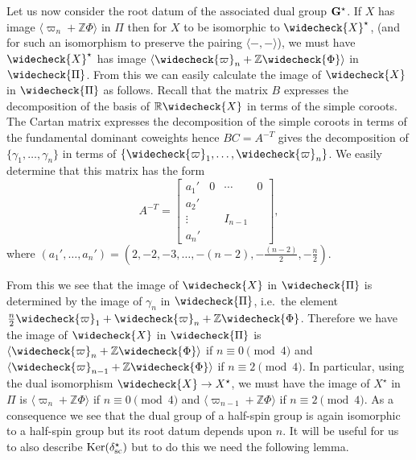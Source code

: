 \documentclass[eqthmnum]{jt-calcs}
\begin{document}
\begin{pa}
Let us now consider the root datum of the associated dual group $\mathbf{G}^{\star}$. If $X$ has image $\langle \varpi_n + \mathbb{Z}\Phi \rangle$ in $\Pi$ then for $X$ to be isomorphic to $\widecheck{X}^{\star}$, (and for such an isomorphism to preserve the pairing $\langle - , - \rangle$), we must have $\widecheck{X}^{\star}$ has image $\langle \widecheck{\varpi}_n + \mathbb{Z}\widecheck{\Phi} \rangle$ in $\widecheck{\Pi}$. From this we can easily calculate the image of $\widecheck{X}$ in $\widecheck{\Pi}$ as follows. Recall that the matrix $B$ expresses the decomposition of the basis of $\mathbb{R}\widecheck{X}$ in terms of the simple coroots. The Cartan matrix expresses the decomposition of the simple coroots in terms of the fundamental dominant coweights hence $BC = A^{-T}$ gives the decomposition of $\{\gamma_1,\dots,\gamma_n\}$ in terms of $\{\widecheck{\varpi}_1,\dots,\widecheck{\varpi}_n\}$. We easily determine that this matrix has the form
\begin{equation*}
A^{-T} = \left[\begin{array}{c|ccc}
a_1' & 0 & \cdots & 0\\\hline
a_2' &  &  & \\
\vdots &  & I_{n-1} & \\
a_n' &  &  & 
\end{array}\right],
\end{equation*}
where $(a_1',\dots,a_n') = (2,-2,-3,\dots,-(n-2),-\frac{(n-2)}{2},-\frac{n}{2})$.

From this we see that the image of $\widecheck{X}$ in $\widecheck{\Pi}$ is determined by the image of $\gamma_n$ in $\widecheck{\Pi}$, i.e.\ the element $\frac{n}{2}\widecheck{\varpi}_1 + \widecheck{\varpi}_n + \mathbb{Z}\widecheck{\Phi}$. Therefore we have the image of $\widecheck{X}$ in $\widecheck{\Pi}$ is $\langle \widecheck{\varpi}_n + \mathbb{Z}\widecheck{\Phi} \rangle$ if $n \equiv 0 \pmod{4}$ and $\langle \widecheck{\varpi}_{n-1} + \mathbb{Z}\widecheck{\Phi} \rangle$ if $n \equiv 2 \pmod{4}$. In particular, using the dual isomorphism $\widecheck{X} \to X^{\star}$, we must have the image of $X^{\star}$ in $\Pi$ is $\langle \varpi_n + \mathbb{Z}\Phi \rangle$ if $n \equiv 0 \pmod{4}$ and $\langle \varpi_{n-1} + \mathbb{Z}\Phi \rangle$ if $n \equiv 2 \pmod{4}$. As a consequence we see that the dual group of a half-spin group is again isomorphic to a half-spin group but its root datum depends upon $n$. It will be useful for us to also describe $\operatorname{Ker}(\delta_{\operatorname{sc}}^{\star})$ but to do this we need the following lemma.
\end{pa}
\end{document}

